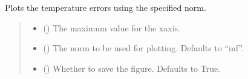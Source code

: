 \documentclass[a4paper,11pt,english,openany]{sphinxmanual}
\begin{document}
\begin{fulllineitems}
\begin{fulllineitems}
\begin{quote}
\begin{description}
\end{description}\end{quote}

\end{fulllineitems}


\begin{fulllineitems}
\label{\detokenize{api/spyice.postprocess.visualise_model:spyice.postprocess.visualise_model.VisualiseModel.plot_error_temp}}
\pysigstartsignatures
{}
\pysigstopsignatures
\sphinxAtStartPar
Plots the temperature errors using the specified norm.
\begin{quote}\begin{description}
\begin{itemize}
\item {} 
\sphinxAtStartPar
{} () \textendash{} The maximum value for the x\sphinxhyphen{}axis.

\item {} 
\sphinxAtStartPar
{} (\sphinxstyleliteralemphasis{\sphinxupquote{, }}) \textendash{} The norm to be used for plotting. Defaults to “inf”.

\item {} 
\sphinxAtStartPar
{} (\sphinxstyleliteralemphasis{\sphinxupquote{, }}) \textendash{} Whether to save the figure. Defaults to True.

\end{itemize}

\end{description}\end{quote}

\end{fulllineitems}


\end{fulllineitems}
\end{document}
